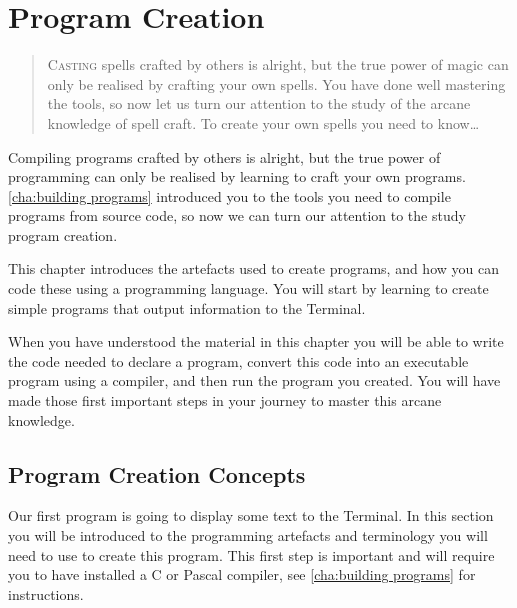 \chapter{Program Creation} %
\label{cha:program_creation}

\begin{quote}
  \Fontlukas\Large
  \renewcommand{\LettrineTextFont}{\relax}
  \lettrine[image=true,lines=3,lraise=0.1]
  {C}{asting} spells crafted by others is alright, but the true power of magic can only be realised by crafting your own spells. You have done well mastering the tools, so now let us turn our attention to the study of the arcane knowledge of spell craft. To create your own spells you need to know\ldots
\end{quote}

\bigskip

Compiling programs crafted by others is alright, but the true power of programming can only be realised by learning to craft your own programs. \cref{cha:building programs} introduced you to the tools you need to compile programs from source code, so now we can turn our attention to the study program creation.

This chapter introduces the artefacts used to create programs, and how you can code these using a programming language. You will start by learning to create simple programs that output information to the Terminal.

When you have understood the material in this chapter you will be able to write the code needed to declare a program, convert this code into an executable program using a compiler, and then run the program you created. You will have made those first important steps in your journey to master this arcane knowledge. 

\minitoc

\clearpage
\section{Program Creation Concepts} %
\label{sec:program_creation_concepts}

Our first program is going to display some text to the Terminal. In this section you will be introduced to the programming artefacts and terminology you will need to use to create this program. This first step is important and will require you to have installed a C or Pascal compiler, see \cref{cha:building programs} for instructions.


